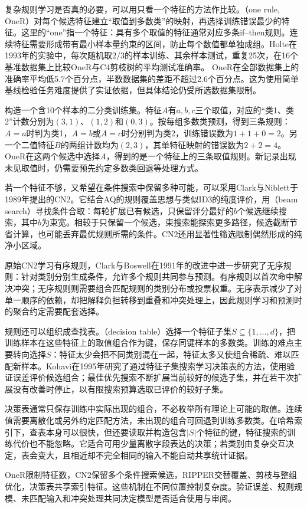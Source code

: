 复杂规则学习是否真的必要，可以用只看一个特征的方法作比较。（one rule, OneR）对每个候选特征建立“取值到多数类”的映射，再选择训练错误最少的特征。这里的“one”指一个特征：具有多个取值的特征通常对应多条if--then规则。连续特征需要形成带有最小样本量约束的区间，防止每个数值都单独成组。Holte在1993年的实验中，每次随机取$2/3$的样本训练、其余样本测试，重复25次，在16个基准数据集上比较OneR与C4剪枝树的平均测试准确率。
OneR在全部数据集上的准确率平均低5.7个百分点，半数数据集的差距不超过2.6个百分点。这为使用简单基线检验任务难度提供了实证依据，但具体结论仍受所选数据集限制。

\begin{example}[一个特征可以产生多条规则]
  \label{ex:classification-oner}
  构造一个含10个样本的二分类训练集。特征$A$有$a,b,c$三个取值，对应的“类1、类2”计数分别为$(3,1)$、$(1,2)$和$(0,3)$。按每组多数类预测，得到三条规则：$A=a$时判为类1，$A=b$或$A=c$时分别判为类2，训练错误数为$1+1+0=2$。另一个二值特征$B$的两组计数均为$(2,3)$，其单特征映射的错误数为$2+2=4$。OneR在这两个候选中选择$A$，得到的是一个特征上的三条取值规则。新记录出现未见取值时，仍需要预先约定多数类回退等处理方式。
\end{example}

若一个特征不够，又希望在条件搜索中保留多种可能，可以采用Clark与Niblett于1989年提出的CN2。它结合AQ的规则覆盖思想与类似ID3的纯度评价，用（beam search）寻找条件合取：每轮扩展已有候选，只保留评分最好的$b$个候选继续搜索，其中$b$为束宽。相较于只保留一个候选，束搜索能探索更多路径，候选截断节省计算，也可能丢弃最优规则所需的条件。CN2还用显著性筛选限制偶然形成的纯净小区域。

原始CN2学习有序规则，Clark与Boswell在1991年的改进中进一步研究了无序规则：针对类别分别生成条件，允许多个规则共同参与预测。有序规则以首次命中解决冲突；无序规则则需要组合匹配规则的类别分布或投票权重。无序表示减少了对单一顺序的依赖，却把解释负担转移到重叠和冲突处理上，因此规则学习和预测时的聚合约定需要配套选择。

规则还可以组织成查找表。（decision table）选择一个特征子集$S\subseteq\{1,\ldots,d\}$，把训练样本在这些特征上的取值组合作为键，保存同键样本的多数类。训练的难点主要转向选择$S$：特征太少会把不同类别混在一起，特征太多又使组合稀疏、难以匹配新样本。Kohavi在1995年研究了通过特征子集搜索学习决策表的方法，使用验证误差评价候选组合；最佳优先搜索不断扩展当前较好的候选子集，并在若干次扩展没有改善时停止，以有限搜索预算选取已评价的较好子集。

决策表通常只保存训练中实际出现的组合，不必枚举所有理论上可能的取值。连续值需要离散化或另外约定匹配方法，未出现的组合可回退到训练多数类。在哈希索引下，查表本身可以很快，但还要读取并构造包含$|S|$个特征的键，特征搜索的训练代价也不能忽略。它适合可用少量离散字段表达的决策；若类别由复杂交互决定，表会变大，且相近却不完全相同的输入不能自动共享统计证据。

OneR限制特征数，CN2保留多个条件搜索候选，RIPPER交替覆盖、剪枝与整组优化，决策表共享索引特征。这些机制在不同位置控制复杂度。验证误差、规则规模、未匹配输入和冲突处理共同决定模型是否适合使用与审阅。